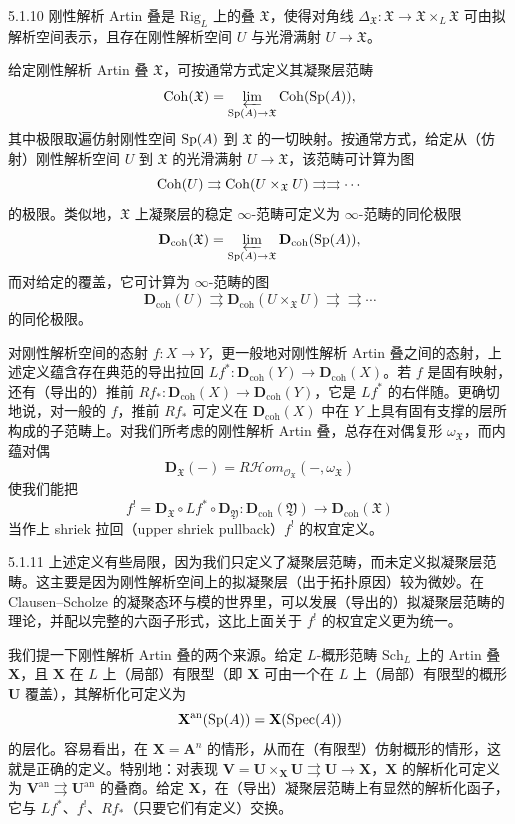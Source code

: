 \begin{defn}{5.1.10}\label{defn:a4-5-1-10}
刚性解析 Artin 叠是 $\mathrm{Rig}_L$ 上的叠 $\mathfrak{X}$，使得对角线 $\Delta_{\mathfrak{X}}:\mathfrak{X}\to\mathfrak{X}\times_L\mathfrak{X}$ 可由拟解析空间表示，且存在刚性解析空间 $U$ 与光滑满射 $U\to\mathfrak{X}$。
\end{defn}

给定刚性解析 Artin 叠 $\mathfrak{X}$，可按通常方式定义其凝聚层范畴
\[
\operatorname{Coh}(\mathfrak{X})=\varprojlim_{\operatorname{Sp}(A)\to\mathfrak{X}}\operatorname{Coh}(\operatorname{Sp}(A)),
\]
其中极限取遍仿射刚性空间 $\operatorname{Sp}(A)$ 到 $\mathfrak{X}$ 的一切映射。按通常方式，给定从（仿射）刚性解析空间 $U$ 到 $\mathfrak{X}$ 的光滑满射 $U\to\mathfrak{X}$，该范畴可计算为图
\[
\operatorname{Coh}(U)\rightrightarrows\operatorname{Coh}(U\times_{\mathfrak{X}}U)\rightrightarrows\rightrightarrows\cdots
\]
的极限。类似地，$\mathfrak{X}$ 上凝聚层的稳定 $\infty$-范畴可定义为 $\infty$-范畴的同伦极限
\[
\mathbf{D}_{\mathrm{coh}}(\mathfrak{X})=\varprojlim_{\operatorname{Sp}(A)\to\mathfrak{X}}\mathbf{D}_{\mathrm{coh}}(\operatorname{Sp}(A)),
\]
而对给定的覆盖，它可计算为 $\infty$-范畴的图
\[
\mathbf{D}_{\mathrm{coh}}(U)\rightrightarrows\mathbf{D}_{\mathrm{coh}}(U\times_{\mathfrak{X}}U)\rightrightarrows\rightrightarrows\cdots
\]
的同伦极限。

对刚性解析空间的态射 $f:X\to Y$，更一般地对刚性解析 Artin 叠之间的态射，上述定义蕴含存在典范的导出拉回 $Lf^*:\mathbf{D}_{\mathrm{coh}}(Y)\to\mathbf{D}_{\mathrm{coh}}(X)$。若 $f$ 是固有映射，还有（导出的）推前 $Rf_*:\mathbf{D}_{\mathrm{coh}}(X)\to\mathbf{D}_{\mathrm{coh}}(Y)$，它是 $Lf^*$ 的右伴随。更确切地说，对一般的 $f$，推前 $Rf_*$ 可定义在 $\mathbf{D}_{\mathrm{coh}}(X)$ 中在 $Y$ 上具有固有支撑的层所构成的子范畴上。对我们所考虑的刚性解析 Artin 叠，总存在对偶复形 $\omega_{\mathfrak{X}}$，而内蕴对偶
\[
\mathbf{D}_{\mathfrak{X}}(-)=R\mathcal{H}om_{\mathcal{O}_{\mathfrak{X}}}(-,\omega_{\mathfrak{X}})
\]
使我们能把
\[
f^!=\mathbf{D}_{\mathfrak{X}}\circ Lf^*\circ\mathbf{D}_{\mathfrak{Y}}:\mathbf{D}_{\mathrm{coh}}(\mathfrak{Y})\to\mathbf{D}_{\mathrm{coh}}(\mathfrak{X})
\]
当作上 shriek 拉回（upper shriek pullback）$f^!$ 的权宜定义。

\begin{rem}{5.1.11}\label{rem:a4-5-1-11}
上述定义有些局限，因为我们只定义了凝聚层范畴，而未定义拟凝聚层范畴。这主要是因为刚性解析空间上的拟凝聚层（出于拓扑原因）较为微妙。在 Clausen--Scholze 的凝聚态环与模的世界里，可以发展（导出的）拟凝聚层范畴的理论，并配以完整的六函子形式，这比上面关于 $f^!$ 的权宜定义更为统一。
\end{rem}

我们提一下刚性解析 Artin 叠的两个来源。给定 $L$-概形范畴 $\mathrm{Sch}_L$ 上的 Artin 叠 $\mathbf{X}$，且 $\mathbf{X}$ 在 $L$ 上（局部）有限型（即 $\mathbf{X}$ 可由一个在 $L$ 上（局部）有限型的概形 $\mathbf{U}$ 覆盖），其解析化可定义为
\[
\mathbf{X}^{\mathrm{an}}(\operatorname{Sp}(A))=\mathbf{X}(\operatorname{Spec}(A))
\]
的层化。容易看出，在 $\mathbf{X}=\mathbf{A}^n$ 的情形，从而在（有限型）仿射概形的情形，这就是正确的定义。特别地：对表现 $\mathbf{V}=\mathbf{U}\times_{\mathbf{X}}\mathbf{U}\rightrightarrows\mathbf{U}\to\mathbf{X}$，$\mathbf{X}$ 的解析化可定义为 $\mathbf{V}^{\mathrm{an}}\rightrightarrows\mathbf{U}^{\mathrm{an}}$ 的叠商。给定 $\mathbf{X}$，在（导出）凝聚层范畴上有显然的解析化函子，它与 $Lf^*$、$f^!$、$Rf_*$（只要它们有定义）交换。

